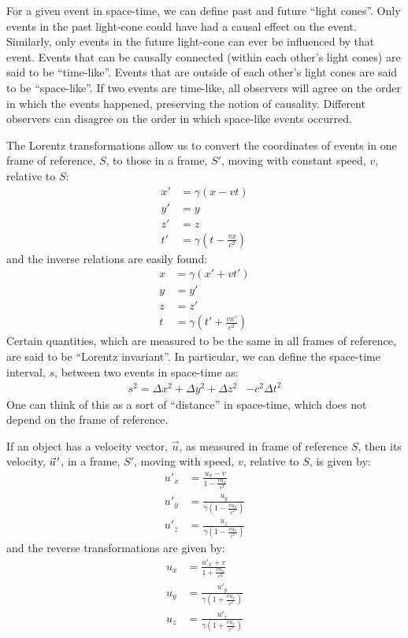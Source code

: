 \begin{chapterSummary}
For a given event in space-time, we can define past and future ``light cones''. Only events in the past light-cone could have had a causal effect on the event. Similarly, only events in the future light-cone can ever be influenced by that event. Events that can be causally connected (within each other's light cones) are said to be ``time-like''. Events that are outside of each other's light cones are said to be ``space-like''. If two events are time-like, all observers will agree on the order in which the events happened, preserving the notion of causality. Different observers can disagree on the order in which space-like events occurred. 

The Lorentz transformations allow us to convert the coordinates of events in one frame of reference, $S$, to those in a frame, $S'$, moving with constant speed, $v$, relative to $S$:
\begin{align*}
x' &=\gamma (x-vt)\\
y' &= y\\
z' &= z\\
t' &=\gamma\left(t-\frac{vx}{c^2} \right)
\end{align*}
and the inverse relations are easily found:
\begin{align*}
x &=\gamma (x'+vt')\\
y &= y'\\
z &= z'\\
t &=\gamma\left(t'+\frac{vx'}{c^2} \right)
\end{align*}
Certain quantities, which are measured to be the same in all frames of reference, are said to be ``Lorentz invariant''. In particular, we can define the space-time interval, $s$, between two events in space-time as:
\begin{align*}
s^2 = \Delta x^2 + \Delta y^2 +\Delta z^2&-c^2\Delta t^2
\end{align*}
One can think of this as a sort of ``distance'' in space-time, which does not depend on the frame of reference.

If an object has a velocity vector, $\vec u$, as measured in frame of reference $S$, then its velocity, $\pvec u'$, in a frame, $S'$, moving with speed, $v$, relative to $S$, is given by:
\begin{align*}
u'_x&=\frac{u_x -v}{1- \frac{vu_x}{c^2}}\\
u'_y &=\frac{u_y}{\gamma\left(1- \frac{vu_x}{c^2}\right)}\\
u'_z &=\frac{u_z}{\gamma\left(1- \frac{vu_x}{c^2}\right)}
\end{align*}
and the reverse transformations are given by:
\begin{align*}
u_x &=\frac{u'_x +v}{1+ \frac{vu_x}{c^2}}\\
u_y &=\frac{u'_y}{\gamma\left(1+ \frac{vu_x}{c^2}\right)}\\
u_z &=\frac{u'_z}{\gamma\left(1+ \frac{vu_x}{c^2}\right)}
\end{align*}


\end{chapterSummary}
